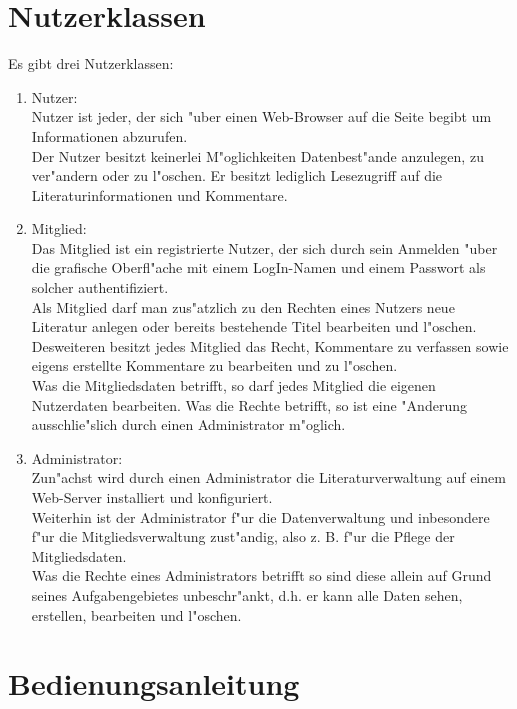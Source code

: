 \section{Nutzerklassen}
Es gibt drei Nutzerklassen:
\begin{enumerate}
\item Nutzer:\\
Nutzer ist jeder, der sich "uber einen Web-Browser auf die Seite begibt um Informationen abzurufen.\\
Der Nutzer besitzt keinerlei M"oglichkeiten Datenbest"ande anzulegen, zu ver"andern oder zu l"oschen. Er besitzt lediglich Lesezugriff auf die Literaturinformationen und Kommentare. \\

\item Mitglied:\\
Das Mitglied ist ein registrierte Nutzer, der sich durch sein Anmelden "uber die grafische Oberfl"ache mit einem LogIn-Namen und einem Passwort als solcher authentifiziert.\\
Als Mitglied darf man zus"atzlich zu den Rechten eines Nutzers neue Literatur anlegen oder bereits bestehende Titel bearbeiten und l"oschen.\\
Desweiteren besitzt jedes Mitglied das Recht, Kommentare zu verfassen sowie eigens erstellte Kommentare zu bearbeiten und zu l"oschen.\\
Was die Mitgliedsdaten betrifft, so darf jedes Mitglied die eigenen Nutzerdaten bearbeiten. Was die Rechte betrifft, so ist eine "Anderung ausschlie"slich durch einen Administrator m"oglich.\\

\item Administrator:\\
Zun"achst wird durch einen Administrator die Literaturverwaltung auf einem Web-Server installiert und konfiguriert.\\
Weiterhin ist der Administrator f"ur die Datenverwaltung und inbesondere f"ur die Mitgliedsverwaltung zust"andig, also z. B. f"ur die Pflege der Mitgliedsdaten.\\
Was die Rechte eines Administrators betrifft so sind diese allein auf Grund seines Aufgabengebietes unbeschr"ankt, d.h. er kann alle Daten sehen, erstellen, bearbeiten und l"oschen.\\ 

\end{enumerate}


\section{Bedienungsanleitung}
